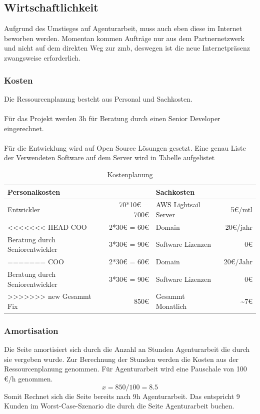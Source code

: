 \documentclass[11pt,a4paper]{article}
\begin{document}
\subsection{Wirtschaftlichkeit}
Aufgrund des Umstieges auf Agenturarbeit, muss auch eben diese im Internet beworben werden. Momentan kommen Aufträge nur aus dem Partnernetzwerk und nicht auf dem direkten Weg zur zmb, deswegen ist die neue Internetpräsenz zwangsweise erforderlich.
\subsubsection{Kosten}
Die Ressourcenplanung besteht aus Personal und Sachkosten.\\\\
Für das Projekt werden 3h für Beratung durch einen Senior Developer eingerechnet.\\\\
Für die Entwicklung wird auf Open Source Lösungen gesetzt. Eine genau Liste der Verwendeten Software auf dem Server wird in Tabelle \pageref{sec:progs} aufgelistet
\begin{table}[!ht]
  \centering
     \begin{tabular}{l|r||l|r}
       \textbf{Personalkosten}  & &\textbf{Sachkosten}& \\
       \hline
       Entwickler      &    70*10€ = 700€    &  AWS Lightsail Server      &     5€/mtl\\
<<<<<<< HEAD
       COO    &  2*30€ = 60€               	    &  Domain & 20€/jahr\\
       Beratung durch Seniorentwickler    &  3*30€ = 90€ & Software Lizenzen & 0€	\\
=======
       COO    &  2*30€ = 60€               	    &  Domain & 20€/Jahr\\
       Beratung durch Seniorentwickler    &  3*30€ = 90€ & Software Lizenzen & 0€	\\
>>>>>>> new
       \hline
       \hline
       Gesammt Fix& 850€ & Gesammt Monatlich & \textasciitilde 7€  \\
     \end{tabular}
\caption{Kostenplanung}
\label{tbl:Kostenplanung}
\end{table}
\subsubsection{Amortisation}
Die Seite amortisiert sich durch die Anzahl an Stunden Agenturarbeit die durch sie vergeben wurde.
Zur Berechnung der Stunden werden die Kosten aus der Ressourcenplanung genommen. Für Agenturarbeit wird eine  Pauschale von 100 €/h genommen.\\
\begin{equation*}
x = 850 / 100 = 8.5
\end{equation*}
Somit Rechnet sich die Seite bereits nach 9h Agenturarbeit. Das entspricht 9 Kunden im Worst-Case-Szenario die durch die Seite Agenturarbeit buchen.
\end{document}
